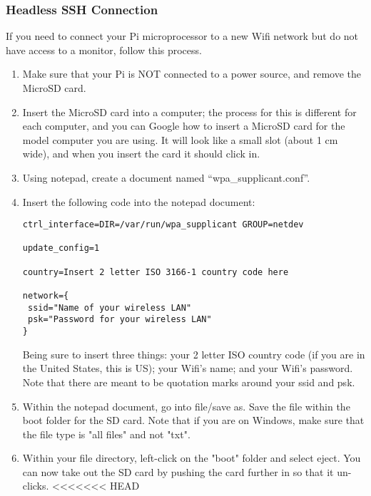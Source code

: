 \documentclass{article}\usepackage[]{graphicx}\usepackage[]{color}
\begin{document}
\subsubsection{Headless SSH Connection}

If you need to connect your Pi microprocessor to a new Wifi network but do not have access to a monitor, follow this process. 

\begin{enumerate}

\item Make sure that your Pi is NOT connected to a power source, and remove the MicroSD card.

\item Insert the MicroSD card into a computer; the process for this is different for each computer, and you can Google how to insert a MicroSD card for the model computer you are using.  It will look like a small slot (about 1 cm wide), and when you insert the card it should click in.

\item Using notepad, create a document named ``wpa\_supplicant.conf''. 

\item Insert the following code into the notepad document:

\begin{lstlisting}
ctrl_interface=DIR=/var/run/wpa_supplicant GROUP=netdev

update_config=1

country=Insert 2 letter ISO 3166-1 country code here

network={
 ssid="Name of your wireless LAN"
 psk="Password for your wireless LAN"
}

\end{lstlisting}

Being sure to insert three things: your 2 letter ISO country code (if you are in the United States, this is US); your Wifi's name; and your Wifi's password.  Note that there are meant to be quotation marks around your ssid and psk.

\item Within the notepad document, go into file/save as.  Save the file within the boot folder for the SD card.  Note that if you are on Windows, make sure that the file type is "all files" and not "txt".

\item Within your file directory, left-click on the "boot" folder and select eject.  You can now take out the SD card by pushing the card further in so that it un-clicks.
<<<<<<< HEAD


\end{enumerate}
\end{document}
